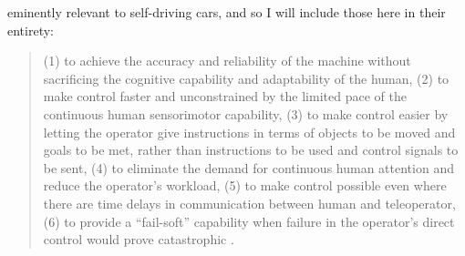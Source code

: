 eminently relevant to self-driving cars, and so I will include those
here in their entirety:
\begin{quote} (1) to achieve the accuracy and reliability of the
  machine without sacrificing the cognitive capability and
  adaptability of the human,
(2) to make control faster and unconstrained by the limited pace of
  the continuous human sensorimotor capability,
(3) to make control easier by letting the operator give instructions
  in terms of objects to be moved and goals to be met, rather than
  instructions to be used and control signals to be sent,
(4) to eliminate the demand for continuous human attention and reduce
  the operator's workload,
(5) to make control possible even where there are time delays in
  communication between human and teleoperator,
(6) to provide a ``fail-soft'' capability when failure in the
  operator's direct control would prove catastrophic \cite[p. 12]{sheridan}.
\end{quote}


